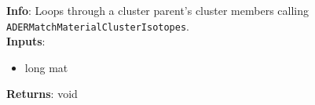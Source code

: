 \textbf{Info}: Loops through a cluster parent's cluster members calling
\texttt{ADERMatchMaterialClusterIsotopes}. \\

\noindent \textbf{Inputs}:
\begin{itemize}
\item{long mat}
\end{itemize}

\noindent \textbf{Returns}: void
